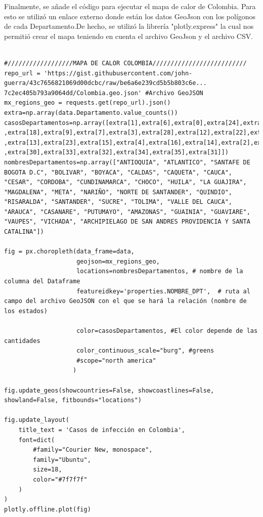 \documentclass[conference,compsoc,onecolumn]{IEEEtran}
\begin{document}
Finalmente, se añade el código para ejecutar el mapa de calor de Colombia. Para esto se utilizó un enlace externo donde están los datos GeoJson con los polígonos de cada Departamento.De hecho, se utilizó la librería  "plotly.express" la cual nos permitió crear el mapa teniendo en cuenta el archivo GeoJson y el archivo CSV.
\\\

\begin{lstlisting}
#//////////////////MAPA DE CALOR COLOMBIA//////////////////////////
repo_url = 'https://gist.githubusercontent.com/john-guerra/43c7656821069d00dcbc/raw/be6a6e239cd5b5b803c6e...
7c2ec405b793a9064dd/Colombia.geo.json' #Archivo GeoJSON
mx_regions_geo = requests.get(repo_url).json()
extra=np.array(data.Departamento.value_counts())
casosDepartamentos=np.array([extra[1],extra[6],extra[0],extra[24],extra[17],extra[19],extra[21]...
,extra[18],extra[9],extra[7],extra[3],extra[28],extra[12],extra[22],extra[25],extra[10],extra[11]...
,extra[13],extra[23],extra[15],extra[4],extra[16],extra[14],extra[2],extra[29],extra[26],extra[27]...
,extra[30],extra[33],extra[32],extra[34],extra[35],extra[31]])
nombresDepartamentos=np.array(["ANTIOQUIA", "ATLANTICO", "SANTAFE DE BOGOTA D.C", "BOLIVAR", "BOYACA", "CALDAS", "CAQUETA", "CAUCA", "CESAR", "CORDOBA", "CUNDINAMARCA", "CHOCO", "HUILA", "LA GUAJIRA", "MAGDALENA", "META", "NARIÑO", "NORTE DE SANTANDER", "QUINDIO", "RISARALDA", "SANTANDER", "SUCRE", "TOLIMA", "VALLE DEL CAUCA", "ARAUCA", "CASANARE", "PUTUMAYO", "AMAZONAS", "GUAINIA", "GUAVIARE", "VAUPES", "VICHADA", "ARCHIPIELAGO DE SAN ANDRES PROVIDENCIA Y SANTA CATALINA"])

fig = px.choropleth(data_frame=data,
                    geojson=mx_regions_geo,
                    locations=nombresDepartamentos, # nombre de la columna del Dataframe
                    featureidkey='properties.NOMBRE_DPT',  # ruta al campo del archivo GeoJSON con el que se hará la relación (nombre de los estados)

                    color=casosDepartamentos, #El color depende de las cantidades
                    color_continuous_scale="burg", #greens
                    #scope="north america"
                   )

fig.update_geos(showcountries=False, showcoastlines=False, showland=False, fitbounds="locations")

fig.update_layout(
    title_text = 'Casos de infección en Colombia',
    font=dict(
        #family="Courier New, monospace",
        family="Ubuntu",
        size=18,
        color="#7f7f7f"
    )
)
plotly.offline.plot(fig)

\end{lstlisting}
\\\
\end{document}

